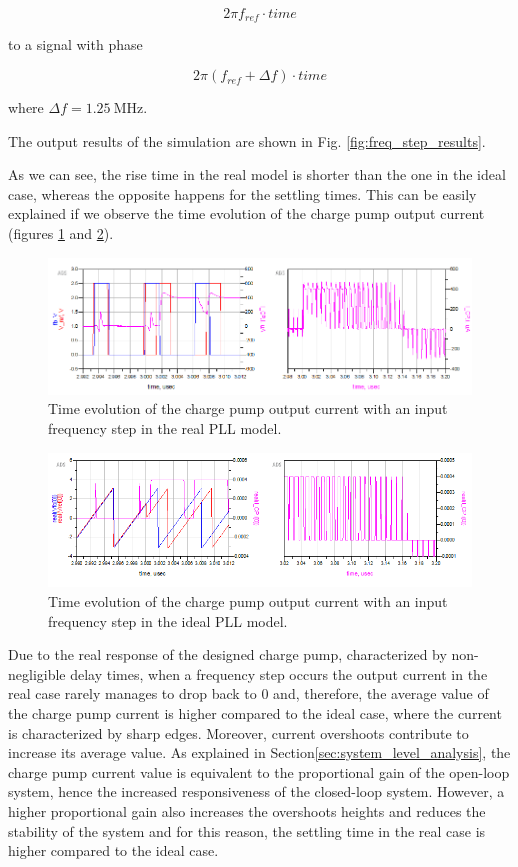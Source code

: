 \documentclass[lettersize,journal]{IEEEtran}
\begin{document}
\[2\pi f_{ref}\cdot time\]

to a signal with phase

\[2\pi \left(f_{ref}+\Delta f\right)\cdot time\]

where $\Delta f=\SI{1.25}{\mega\hertz}$.

The output results of the simulation are shown in Fig. \ref{fig:freq_step_results}.

As we can see, the rise time in the real model is shorter than the one in the ideal case, whereas the opposite happens for the settling times. This can be easily explained if we observe the time evolution of the charge pump output current (figures \ref{fig:freq_step_real_currents} and \ref{fig:freq_step_ideal_currents}).

\begin{figure}[!h]
    \centering
    \includegraphics[width=1\linewidth]{images/ads_results/freq_step/real_step.png}
    \caption{Time evolution of the charge pump output current with an input frequency step in the real PLL model.}
    \label{fig:freq_step_real_currents}
\end{figure}

\begin{figure}[!h]
    \centering
    \includegraphics[width=1\linewidth]{images/ads_results/freq_step/ideal_step.png}
    \caption{Time evolution of the charge pump output current with an input frequency step in the ideal PLL model.}
    \label{fig:freq_step_ideal_currents}
\end{figure}

Due to the real response of the designed charge pump, characterized by non-negligible delay times, when a frequency step occurs the output current in the real case rarely manages to drop back to 0 and, therefore, the average value of the charge pump current is higher compared to the ideal case, where the current is characterized by sharp edges. Moreover, current overshoots contribute to increase its average value. As explained in Section\ref{sec:system_level_analysis}, the charge pump current value is equivalent to the proportional gain of the open-loop system, hence the increased responsiveness of the closed-loop system. However, a higher proportional gain also increases the overshoots heights and reduces the stability of the system and for this reason, the settling time in the real case is higher compared to the ideal case.
\end{document}
